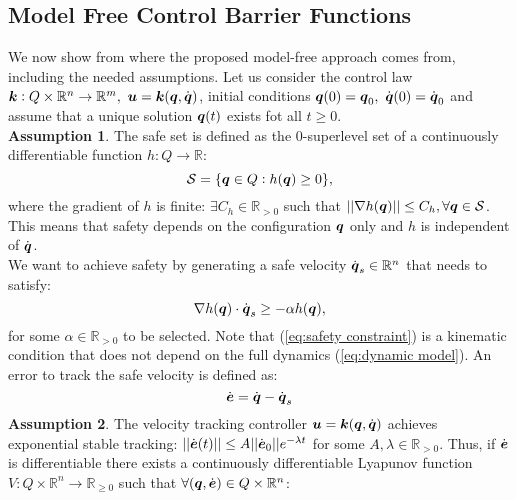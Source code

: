 \subsection{Model Free Control Barrier Functions}
We now show from where the proposed model-free approach comes from, including the needed assumptions. Let us consider the control law $ \boldsymbol{k}:Q\times \mathbb{R}^n \rightarrow \mathbb{R}^m,~\boldsymbol{u}=\boldsymbol{k}({\boldsymbol{q}},\dot{\boldsymbol{q}})$, initial conditions ${\boldsymbol{q}}(0) = {\boldsymbol{q}}_0,~\dot{{\boldsymbol{q}}}(0)=\dot{{\boldsymbol{q}}}_0$ and assume that a unique solution ${\boldsymbol{q}}(t)$ exists fot all $t \geq 0$. 
\\
\textbf{Assumption 1}. The safe set is defined as the 0-superlevel set of a continuously differentiable function $h: Q \rightarrow \mathbb{R}$:
\begin{equation} \label{eq:safe set}
    \mathcal{S} = \{{\boldsymbol{q}} \in Q: h({\boldsymbol{q}})\geq 0 \},
\end{equation}
where the gradient of $h$ is finite: $\exists C_h \in \mathbb{R}_{>0}$ such that $|| \nabla h({\boldsymbol{q}})|| \leq C_h, \forall {\boldsymbol{q}} \in \mathcal{S}$. This means that safety depends on the configuration ${\boldsymbol{q}}$ only and $h$ is independent of $\dot{{\boldsymbol{q}}}$.
\\
We want to achieve safety by generating a safe velocity $\dot{{\boldsymbol{q}}}_s \in \mathbb{R}^n$ that needs to satisfy:
\begin{equation} \label{eq:safety constraint}
    \nabla h({\boldsymbol{q}})\cdot\dot{\boldsymbol{q}}_s \geq -\alpha h({\boldsymbol{q}}),
\end{equation}
for some $\alpha \in \mathbb{R}_{>0}$ to be selected. Note that (\ref{eq:safety constraint}) is a kinematic condition that does not depend on the full dynamics (\ref{eq:dynamic model}).
An error to track the safe velocity is defined as: 
\begin{equation}\label{eq:error}
\dot{\boldsymbol{e}} = \dot{{\boldsymbol{q}}}-\dot{{\boldsymbol{q}}}_s 
\end{equation}
\textbf{Assumption 2}. The velocity tracking controller $\boldsymbol{u} = \boldsymbol{k}({\boldsymbol{q}},\dot{\boldsymbol{q}})$ achieves exponential stable tracking: $||\dot{\boldsymbol{e}}(t)||\leq A ||\dot{\boldsymbol{e}}_0|| e^{-\lambda t}$ for some $A,\lambda \in \mathbb{R}_{>0}$.
 Thus, if $\dot{\boldsymbol{e}}$ is differentiable there exists a continuously differentiable Lyapunov function $V: Q \times \mathbb{R}^n \rightarrow \mathbb{R}_{\geq 0}$ such that $\forall({\boldsymbol{q}},\dot{\boldsymbol{e}})\in Q \times \mathbb{R}^n$:
